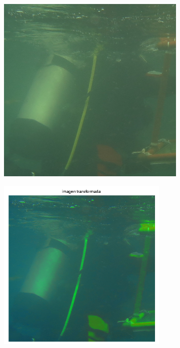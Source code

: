 \documentclass{article}
\begin{document}
\begin{figure}[H]
	\begin{subfigure}{0.5\textwidth}
	\centering
        \includegraphics[scale=0.5]{1908xx.png}
    \end{subfigure}\hfill
	\begin{subfigure}{0.5\textwidth}
	\centering
        \includegraphics[width=0.9\textwidth]{1908xx-transformada-40-3x-log.png}
    \end{subfigure}\hfill
\end{figure}\hfill
\end{document}
